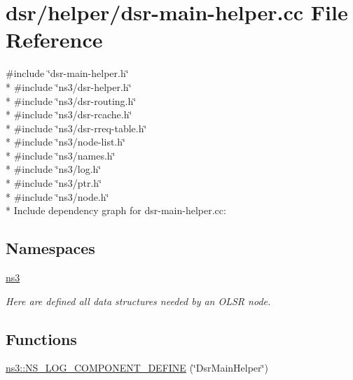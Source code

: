 \hypertarget{dsr-main-helper_8cc}{}\section{dsr/helper/dsr-\/main-\/helper.cc File Reference}
\label{dsr-main-helper_8cc}
{\ttfamily \#include \char`\"{}dsr-\/main-\/helper.\+h\char`\"{}}\\*
{\ttfamily \#include \char`\"{}ns3/dsr-\/helper.\+h\char`\"{}}\\*
{\ttfamily \#include \char`\"{}ns3/dsr-\/routing.\+h\char`\"{}}\\*
{\ttfamily \#include \char`\"{}ns3/dsr-\/rcache.\+h\char`\"{}}\\*
{\ttfamily \#include \char`\"{}ns3/dsr-\/rreq-\/table.\+h\char`\"{}}\\*
{\ttfamily \#include \char`\"{}ns3/node-\/list.\+h\char`\"{}}\\*
{\ttfamily \#include \char`\"{}ns3/names.\+h\char`\"{}}\\*
{\ttfamily \#include \char`\"{}ns3/log.\+h\char`\"{}}\\*
{\ttfamily \#include \char`\"{}ns3/ptr.\+h\char`\"{}}\\*
{\ttfamily \#include \char`\"{}ns3/node.\+h\char`\"{}}\\*
Include dependency graph for dsr-\/main-\/helper.cc\+:
\subsection*{Namespaces}
\begin{DoxyCompactItemize}
\item 
 \hyperlink{namespacens3}{ns3}
\begin{DoxyCompactList}\small\item\em Here are defined all data structures needed by an O\+L\+SR node. \end{DoxyCompactList}\end{DoxyCompactItemize}
\subsection*{Functions}
\begin{DoxyCompactItemize}
\item 
\hyperlink{namespacens3_a8efcb8a081abb34d403e639c92e1adfa}{ns3\+::\+N\+S\+\_\+\+L\+O\+G\+\_\+\+C\+O\+M\+P\+O\+N\+E\+N\+T\+\_\+\+D\+E\+F\+I\+NE} (\char`\"{}Dsr\+Main\+Helper\char`\"{})
\end{DoxyCompactItemize}
